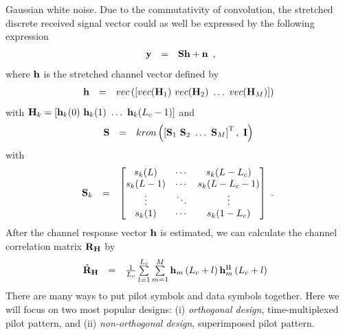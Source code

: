 \documentclass[10pt,fleqn, twocolumn]{IEEEtran}
\newcommand{\bh}{{\bf h}}
\newcommand{\bH}{{\bf H}}
\newcommand{\bn}{{\bf n}}
\newcommand{\by}{{\bf y}}
\newcommand{\bS}{{\bf S}}
\newcommand{\bI}{{\bf I}}
\newcommand{\bR}{{\bf R}}
\begin{document}
Gaussian white noise. Due to the commutativity of convolution, the
stretched discrete received signal vector could as well be
expressed by the following expression
\begin{equation}%
\begin{array}{rcl}
\by&=&\bS\bh+\bn
\end{array},
\end{equation}
\noindent where $\bh$ is the stretched channel vector defined by
\begin{equation}\hspace{-0.00in}
\begin{array}{rcl}
\bh&=&\mbox{vec}\left(\left[\mbox{vec}(\bH_{1})\
\mbox{vec}(\bH_{2})\ \ldots\ \mbox{vec}(\bH_{M})\right]\right)
\end{array}
\end{equation}
\noindent with $\bH_{k}=\left[\bh_{k}(0)\ \bh_{k}(1)\ \ldots\
\bh_{k}(L_{c}-1)\right]$ and
\begin{equation}\hspace{-0.00in}
\begin{array}{rcl}
\bS&=&\mbox{kron}\left(\left[\bS_{1}\ \bS_{2}\ \ldots\
\bS_{M}\right]^{\rm T},\ \bI\right)
\end{array}
\end{equation}
\noindent with
\begin{equation}\hspace{-0.10in}
\begin{array}{rcl}
\bS_{k}&=&\left[\begin{matrix}
s_{k}(L)&\cdots&s_{k}(L-L_{c})\\
s_{k}(L-1)&\cdots&s_{k}(L-L_{c}-1)\\
\vdots&\ddots&\vdots\\
s_{k}(1)&\cdots&s_{k}(1-L_{c})
\end{matrix}\right]
\end{array}.\label{S_k}
\end{equation}
After the channel response vector $\bh$ is estimated, we can
calculate the channel correlation matrix $\bR_{\bH}$ by
\begin{equation}\hspace{-0.1in}
\begin{array}{rcl}
\hat{\bR}_{\bH}&=&\frac{1}{L_{c}}\sum\limits_{l=1}^{L_{c}}\sum\limits_{m=1}^{M}\bh_{m}\left(L_{c}+l\right)\bh_{m}^{\rm
H}\left(L_{c}+l\right)
\end{array}\label{R_h_actual}
\end{equation}
\noindent There are many ways to put pilot symbols and data
symbols together. Here we will focus on two most popular designs:
(i) {\em orthogonal design}, {time-multiplexed pilot pattern}, and
(ii) {\em non-orthogonal design}, {superimposed pilot pattern}.
\end{document}
